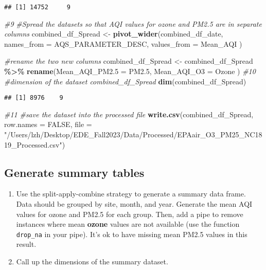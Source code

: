 \documentclass[
]{article}
\newenvironment{Shaded}{\begin{snugshade}}{\end{snugshade}}
\newcommand{\AttributeTok}[1]{\textcolor[rgb]{0.13,0.29,0.53}{#1}}
\newcommand{\CommentTok}[1]{\textcolor[rgb]{0.56,0.35,0.01}{\textit{#1}}}
\newcommand{\ConstantTok}[1]{\textcolor[rgb]{0.56,0.35,0.01}{#1}}
\newcommand{\FloatTok}[1]{\textcolor[rgb]{0.00,0.00,0.81}{#1}}
\newcommand{\FunctionTok}[1]{\textcolor[rgb]{0.13,0.29,0.53}{\textbf{#1}}}
\newcommand{\NormalTok}[1]{#1}
\newcommand{\OtherTok}[1]{\textcolor[rgb]{0.56,0.35,0.01}{#1}}
\newcommand{\SpecialCharTok}[1]{\textcolor[rgb]{0.81,0.36,0.00}{\textbf{#1}}}
\newcommand{\StringTok}[1]{\textcolor[rgb]{0.31,0.60,0.02}{#1}}
\begin{document}
\begin{verbatim}
## [1] 14752     9
\end{verbatim}

\begin{Shaded}
\begin{Highlighting}[]
\CommentTok{\#9}
\CommentTok{\#Spread the datasets so that AQI values for ozone and PM2.5 are in separate columns}
\NormalTok{combined\_df\_Spread }\OtherTok{\textless{}{-}} \FunctionTok{pivot\_wider}\NormalTok{(combined\_df\_date, }
    \AttributeTok{names\_from =}\NormalTok{ AQS\_PARAMETER\_DESC,}
    \AttributeTok{values\_from =}\NormalTok{ Mean\_AQI}
\NormalTok{  )}

\CommentTok{\#rename the two new columns}
\NormalTok{combined\_df\_Spread }\OtherTok{\textless{}{-}}\NormalTok{ combined\_df\_Spread }\SpecialCharTok{\%\textgreater{}\%}
  \FunctionTok{rename}\NormalTok{(}\AttributeTok{Mean\_AQI\_PM2.5 =}\NormalTok{ PM2}\FloatTok{.5}\NormalTok{, }\AttributeTok{Mean\_AQI\_O3 =}\NormalTok{ Ozone )}
\CommentTok{\#10}
\CommentTok{\#dimension of the dataset combined\_df\_Spread}
\FunctionTok{dim}\NormalTok{(combined\_df\_Spread)}
\end{Highlighting}
\end{Shaded}

\begin{verbatim}
## [1] 8976    9
\end{verbatim}

\begin{Shaded}
\begin{Highlighting}[]
\CommentTok{\#11}
\CommentTok{\#save the dataset into the processed file}
\FunctionTok{write.csv}\NormalTok{(combined\_df\_Spread, }\AttributeTok{row.names =} \ConstantTok{FALSE}\NormalTok{, }
          \AttributeTok{file =} \StringTok{"/Users/lzh/Desktop/EDE\_Fall2023/Data/Processed/EPAair\_O3\_PM25\_NC1819\_Processed.csv"}\NormalTok{)}
\end{Highlighting}
\end{Shaded}

\hypertarget{generate-summary-tables}{%
\subsection{Generate summary tables}\label{generate-summary-tables}}

\begin{enumerate}
\def\labelenumi{\arabic{enumi}.}
\setcounter{enumi}{11}
\item
  Use the split-apply-combine strategy to generate a summary data frame.
  Data should be grouped by site, month, and year. Generate the mean AQI
  values for ozone and PM2.5 for each group. Then, add a pipe to remove
  instances where mean \textbf{ozone} values are not available (use the
  function \texttt{drop\_na} in your pipe). It's ok to have missing mean
  PM2.5 values in this result.
\item
  Call up the dimensions of the summary dataset.
\end{enumerate}
\end{document}
